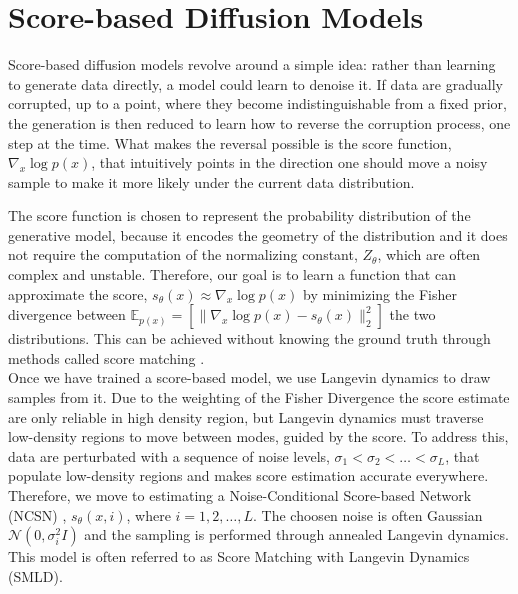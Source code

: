 \section{Score-based Diffusion Models}
\label{sec:scorediffmodels}
Score-based diffusion models revolve around a simple idea: rather than learning to generate data directly, a model could learn to denoise it. If data are gradually corrupted, up to a point, where they become indistinguishable from a fixed prior, the generation is then reduced to learn how to reverse the corruption process, one step at the time. What makes the reversal possible is the score function,\(\nabla_x \log p(x)\), that intuitively points in the direction one should move a noisy sample to make it more likely under the current data distribution.

The score function is chosen to represent the probability distribution of the generative model, because it encodes the geometry of the distribution and it does not require the computation of the normalizing constant, $Z_\theta$, which are often complex and unstable. Therefore, our goal is to learn a function that can approximate the score, \(s_\theta(x)\approx\nabla_x \log p(x)\) by minimizing the Fisher divergence between \(\mathbb{E}_{p(x)}=\left[\|\nabla_x\log p(x)-s_\theta (x)\|^2_2\right]\) the two distributions. This can be achieved without knowing the ground truth through methods called score matching \cite{hyvarinen2005estimation, vincent2011connection}.\\

Once we have trained a score-based model, we use Langevin dynamics \cite{parisi1981correlation} to draw samples from it. Due to the weighting of the Fisher Divergence the score estimate are only reliable in high density region, but Langevin dynamics must traverse low-density regions to move between modes, guided by the score. To address this, data are perturbated with a sequence of noise levels, \(\sigma_1< \sigma_2< \dots<\sigma_L\), that populate low-density regions and makes score estimation accurate everywhere. Therefore, we move to estimating a Noise-Conditional Score-based Network (NCSN) \cite{song2019generative}, \(s_\theta(x,i)\), where \(i=1,2,\dots,L\). The choosen noise is often Gaussian \(\mathcal{N}(0,\sigma_i^2I)\) and the sampling is performed through annealed Langevin dynamics. This model is often referred to as Score Matching with Langevin Dynamics (SMLD).\\

